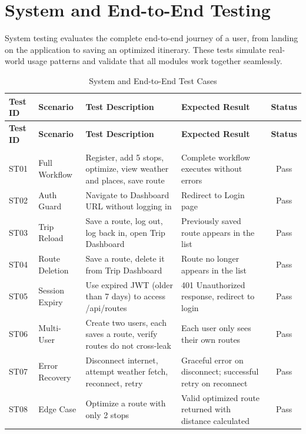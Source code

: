 \section{System and End-to-End Testing}
System testing evaluates the complete end-to-end journey of a user, from landing on the application to saving an optimized itinerary. These tests simulate real-world usage patterns and validate that all modules work together seamlessly.

\begin{longtable}{|p{1.2cm}|p{2.2cm}|p{4.5cm}|p{3.5cm}|c|}
    \hline
    \textbf{Test ID} & \textbf{Scenario} & \textbf{Test Description} & \textbf{Expected Result} & \textbf{Status} \\
    \hline
    \endfirsthead
    \hline
    \textbf{Test ID} & \textbf{Scenario} & \textbf{Test Description} & \textbf{Expected Result} & \textbf{Status} \\
    \hline
    \endhead
    \hline
    \endfoot
    \hline
    \caption{System and End-to-End Test Cases} \label{tab:system_tests} \\
    \endlastfoot

    ST01 & Full Workflow & Register, add 5 stops, optimize, view weather and places, save route & Complete workflow executes without errors & Pass \\
    \hline
    ST02 & Auth Guard & Navigate to Dashboard URL without logging in & Redirect to Login page & Pass \\
    \hline
    ST03 & Trip Reload & Save a route, log out, log back in, open Trip Dashboard & Previously saved route appears in the list & Pass \\
    \hline
    ST04 & Route Deletion & Save a route, delete it from Trip Dashboard & Route no longer appears in the list & Pass \\
    \hline
    ST05 & Session Expiry & Use expired JWT (older than 7 days) to access /api/routes & 401 Unauthorized response, redirect to login & Pass \\
    \hline
    ST06 & Multi-User & Create two users, each saves a route, verify routes do not cross-leak & Each user only sees their own routes & Pass \\
    \hline
    ST07 & Error Recovery & Disconnect internet, attempt weather fetch, reconnect, retry & Graceful error on disconnect; successful retry on reconnect & Pass \\
    \hline
    ST08 & Edge Case & Optimize a route with only 2 stops & Valid optimized route returned with distance calculated & Pass \\
    \hline
\end{longtable}

